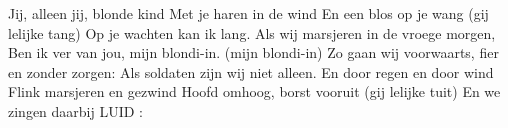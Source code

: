 \beginverse
Jij, alleen jij,   blonde kind
Met je haren   in de wind
En een blos   op je wang (gij lelijke tang)
Op je wachten kan ik lang.
\endverse
\beginchorus
Als wij marsjeren in de vroege morgen,
Ben ik ver van jou, mijn blondi-in. (mijn blondi-in)
Zo gaan wij voorwaarts, fier en zonder zorgen:
Als soldaten zijn wij niet alleen.
\endchorus
\beginverse
En door regen   en door wind
Flink marsjeren   en gezwind
Hoofd omhoog,   borst vooruit (gij lelijke tuit)
En we zingen daarbij LUID :
\endverse
\endsong